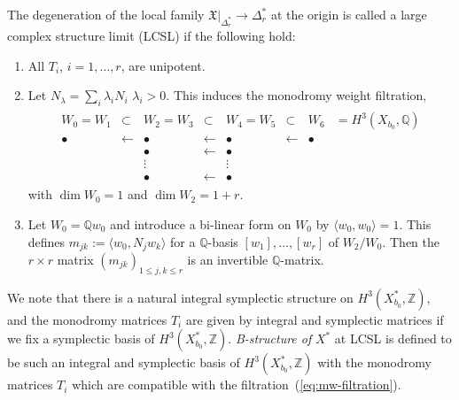 \documentclass[pdftex]{sigma}
\numberwithin{equation}{section}
\begin{document}
\begin{Definition} \label{def:LCSL}The degeneration of the local family $\mathfrak{X}|_{\Delta_{r}^{*}}\to\Delta_{r}^{*}$ at the origin is called a large complex structure limit (LCSL) if the following hold:
\begin{enumerate}\itemsep=0pt
\item[(1)] All $T_{i}$, $i=1,\dots,r$, are unipotent.

\item[(2)] Let $N_{\lambda}=\sum_{i}\lambda_{i}N_{i}$ $\lambda_{i}>0$. This induces the monodromy weight filtration,
\begin{gather}
\begin{matrix}W_{0}=W_{1} & \subset & W_{2}=W_{3} & \subset & W_{4}=W_{5} & \subset & W_{6} & =H^{3}(X_{b_{0}},\mathbb{Q})\\
\bullet & \leftarrow & \bullet & \leftarrow & \bullet & \leftarrow & \bullet\\
 & & \bullet & \leftarrow & \bullet\\
 & & \vdots & & \vdots\\
 & & \bullet & \leftarrow & \bullet
\end{matrix}\label{eq:mw-filtration}
\end{gather}
with $\dim W_{0}=1$ and $\dim W_{2}=1+r$.

\item[(3)] Let $W_{0}=\mathbb{Q}w_{0}$ and introduce a bi-linear form on $W_{0}$ by $\langle w_{0},w_{0}\rangle=1$. This defines $m_{jk}:=\langle w_{0},N_{j}w_{k}\rangle$ for a $\mathbb{Q}$-basis $[w_{1}],\dots,[w_{r}]$ of $W_{2}/W_{0}$. Then the $r\times r$ matrix $(m_{jk})_{1\leq j,k\leq r}$ is an invertible $\mathbb{Q}$-matrix.
\end{enumerate}
\end{Definition}

We note that there is a natural integral symplectic structure on $H^{3}(X_{b_{0}}^{*},\mathbb{Z})$, and the mono\-dromy matrices $T_{i}$ are given by integral and symplectic matrices if we fix a symplectic basis of $H^{3}(X_{b_{0}}^{*},\mathbb{Z})$. \textit{B-structure of} $X^{*}$ at LCSL is defined to be such an integral and symplectic basis of $H^{3}(X_{b_{0}}^{*},\mathbb{Z})$ with the monodromy matrices $T_{i}$ which are compatible with the filtration~(\ref{eq:mw-filtration}).
\end{document}
